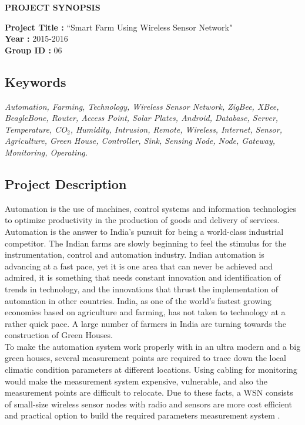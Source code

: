 \documentclass[10pt,a4paper]{article}
\begin{document}
\begin{center}
\begin{huge}
\textbf{PROJECT SYNOPSIS}
\end{huge}
\end{center} 
\textbf{Project Title : } ``Smart Farm Using Wireless Sensor Network" \\
\textbf{Year : } 2015-2016 \\
\textbf{Group ID : } 06
\begin{large}
\section{Keywords}
\end{large}

\quad
\textit{Automation, Farming, Technology, Wireless Sensor Network, ZigBee, XBee, BeagleBone, Router, Access Point, Solar Plates, Android, Database, Server, Temperature, CO\ensuremath{_2}, Humidity, Intrusion, Remote, Wireless, Internet, Sensor, Agriculture, Green House, Controller, Sink, Sensing Node, Node, Gateway, Monitoring, Operating.} 
 
\begin{large}
\section{Project Description}
\end{large}
\quad
Automation is the use of machines, control systems and information technologies to optimize productivity in the production of goods and delivery of services. Automation is the answer to India's pursuit for being a world-class industrial competitor. The Indian farms are slowly beginning to feel the stimulus for the instrumentation, control and automation industry. Indian automation is advancing at a fast pace, yet it is one area that can never be achieved and admired, it is something that needs constant innovation and identification of trends in technology, and the innovations that thrust the implementation of automation in other countries. India, as one of the world's fastest growing economies based on agriculture and farming, has not taken to technology at a rather quick pace. A large number of farmers in India are turning towards the construction of Green Houses. \\

\quad
To make the automation system work properly with in an ultra modern and a big green houses, several measurement points are required to trace down the local climatic condition parameters at different locations. Using cabling for monitoring would make the measurement system expensive, vulnerable,
and also the measurement points are difficult to relocate. Due to these facts, a WSN consists of small-size wireless sensor nodes with radio and sensors are more cost efficient and practical option to build the required parameters measurement system \cite{1}. \\
\end{document}
